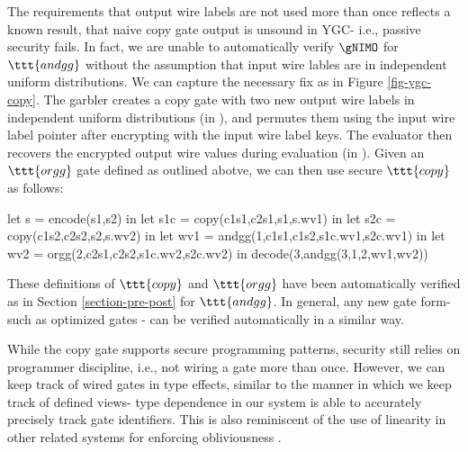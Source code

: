 The requirements that output wire labels are not used more than once
reflects a known result, that naive copy gate output is unsound in
YGC- i.e., passive security fails. In fact, we are unable to
automatically verify $\gNIMO$ for $\ttt{andgg}$ without the assumption
that input wire lables are in independent uniform distributions. We
can capture the necessary fix as in Figure \ref{fig-ygc-copy}. The
garbler creates a copy gate with two new output wire labels in
independent uniform distributions (in ), and permutes
them using the input wire label pointer after encrypting with the
input wire label keys. The evaluator then recovers the encrypted
output wire values during evaluation (in ). Given an
$\ttt{orgg}$ gate defined as outlined abotve, we can then use
secure $\ttt{copy}$ as follows: 
\begin{verbatimtab}
  let s = encode(s1,s2) in
  let s1c = copy(c1s1,c2s1,s1,s.wv1) in
  let s2c = copy(c1s2,c2s2,s2,s.wv2) in
  let wv1 = andgg(1,c1s1,c1s2,s1c.wv1,s2c.wv1) in
  let wv2 = orgg(2,c2s1,c2s2,s1c.wv2,s2c.wv2) in
  decode(3,andgg(3,1,2,wv1,wv2))
\end{verbatimtab}
These definitions of $\ttt{copy}$ and $\ttt{orgg}$ have been
automatically verified as in Section \ref{section-pre-post} for
$\ttt{andgg}$. In general, any new gate form- such as optimized gates
\cite{XXX}- can be verified automatically in a similar way.

While the copy gate supports secure programming patterns, security
still relies on programmer discipline, i.e., not wiring a gate more
than once. However, we can keep track of wired gates in type effects,
similar to the manner in which we keep track of defined views- type
dependence in our system is able to accurately precisely track
gate identifiers. This is also reminiscent of the use of linearity
in other related systems for enforcing obliviousness \cite{darais2019language}. 

